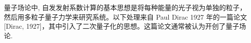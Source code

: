 \documentclass[14pt,a4paper,oneside]{article}
\numberwithin{equation}{section}             %
\numberwithin{figure}{section}               %
\begin{document}
量子场论中, 自发发射系数计算的基本思想是将每种能量的光子视为单独的粒子，然后用多粒子量子力学来研究系统。以下处理来自 Paul Dirac 1927 年的一篇论文 [Dirac, 1927]，其中引入了二次量子化的思想。这篇论文通常被认为开创了量子场论. 


\newpage

\clearpage           %




\end{document}
